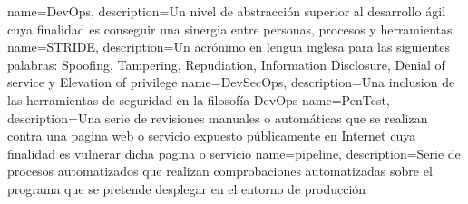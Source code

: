 {
        name=DevOps,
        description={Un nivel de abstracción superior al desarrollo ágil cuya
        finalidad es conseguir una sinergia entre personas, procesos y
        herramientas}
}
{
        name=STRIDE,
        description={Un acrónimo en lengua inglesa para las siguientes palabras:
        Spoofing, Tampering, Repudiation, Information Disclosure, Denial of
        service y Elevation of privilege}
}
{
        name=DevSecOps,
        description={Una inclusion de las herramientas de seguridad en la
        filosofía DevOps}
}
{
        name=PenTest,
        description={Una serie de revisiones manuales o automáticas que se
        realizan contra una pagina web o servicio expuesto públicamente en
        Internet cuya
        finalidad es vulnerar dicha pagina o servicio}
}
{
        name=pipeline,
        description={Serie de procesos automatizados que realizan comprobaciones
        automatizadas sobre el programa que se pretende desplegar en el entorno
        de producción}
}

